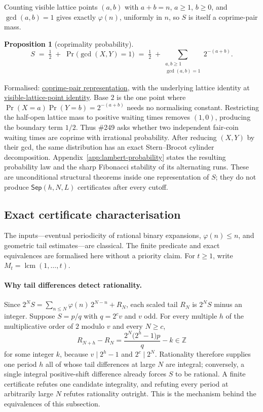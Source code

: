 \documentclass[11pt]{article}
\newcommand{\commit}{ebc98ee71f6819bd9fe344a0bb343542c604e533}
\newcommand{\repobase}{https://github.com/wcook04/plectis-lean-erdos249-257/blob/\commit}
\newcommand{\PK}{Erdos249257}
\newcommand{\lword}[4]{\href{\repobase/\PK/#1\#L#2}{#4}}
\newtheorem{proposition}[theorem]{Proposition}
\theoremstyle{definition}
\theoremstyle{remark}
\newcommand{\Z}{\mathbb{Z}}
\newcommand{\ph}{\varphi}
\newcommand{\lcm}{\operatorname{lcm}}
\begin{document}
Counting visible lattice points $(a,b)$ with $a+b=n$, $a\ge1$, $b\ge0$, and $\gcd(a,b)=1$ gives
exactly $\ph(n)$, uniformly in $n$, so $S$ is itself a coprime-pair mass.

\begin{proposition}[coprimality probability]\label{res:coprime}
\[
S \;=\; \tfrac12 \;+\; \Pr\!\big(\gcd(X,Y)=1\big)
\;=\; \tfrac12 \;+\!\!\sum_{\substack{a,b\ge1\\ \gcd(a,b)=1}}\!\! 2^{-(a+b)}.
\]
\end{proposition}
\noindent Formalised: \lword{CertificateKernel.lean}{18229}{totient_series_eq_half_add_visible_coprime_pairs}{coprime-pair representation},
with the underlying lattice identity at
\lword{CertificateKernel.lean}{18216}{tsum_visible_coprime_pairs_eq_totient_series}{visible-lattice-point identity}.
Base $2$ is the one point where $\Pr(X=a)\Pr(Y=b)=2^{-(a+b)}$ needs no normalising
constant.  Restricting the half-open lattice mass to positive waiting times
removes $(1,0)$, producing the boundary term $1/2$.  Thus \#249 asks whether two independent
fair-coin waiting times are coprime with irrational probability.
After reducing $(X,Y)$ by their gcd, the same distribution has an exact
Stern--Brocot cylinder decomposition.
Appendix~\ref{app:lambert-probability} states the resulting probability law
and the sharp Fibonacci stability of its alternating runs.  These are
unconditional structural theorems inside one representation of \(S\); they
do not produce \(\mathsf{Sep}(h,N,L)\) certificates after every cutoff.

\subsection{Exact certificate characterisation}\label{sec:reduction}

The inputs---eventual periodicity of rational binary expansions,
$\ph(n)\le n$, and geometric tail estimates---are classical.  The finite
predicate and exact equivalences are formalised here without a priority claim.
For $t\ge1$, write $M_t=\lcm(1,\ldots,t)$.

\paragraph{Why tail differences detect rationality.}
Since \(2^NS=\sum_{n\le N}\ph(n)\,2^{N-n}+R_N\), each scaled tail
\(R_N\) is \(2^NS\) minus an integer.  Suppose \(S=p/q\) with
\(q=2^cv\) and \(v\) odd.  For every multiple \(h\) of the
multiplicative order of \(2\) modulo \(v\) and every \(N\geq c\),
\[
 R_{N+h}-R_N
 =\frac{2^N\bigl(2^h-1\bigr)p}{q}-k
 \in\Z
\]
for some integer \(k\), because \(v\mid2^h-1\) and \(2^c\mid2^N\).
Rationality therefore supplies one period \(h\) all of whose tail
differences at large \(N\) are integral; conversely, a single integral
positive-shift difference already forces \(S\) to be rational.  A finite
certificate refutes one candidate integrality, and refuting every period
at arbitrarily large \(N\) refutes rationality outright.  This is the
mechanism behind the equivalences of this subsection.
\end{document}
